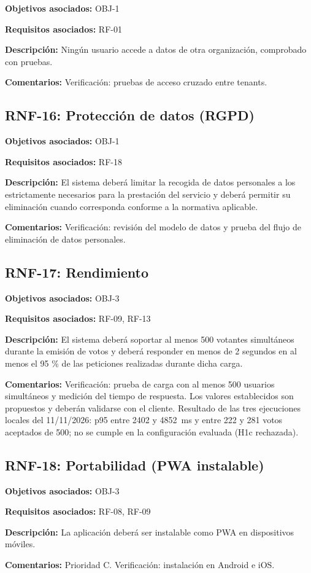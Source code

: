 \textbf{Objetivos asociados:} OBJ-1\par
\textbf{Requisitos asociados:} RF-01\par
\textbf{Descripción:} Ningún usuario accede a datos de otra organización, comprobado con pruebas.\par
\textbf{Comentarios:} Verificación: pruebas de acceso cruzado entre tenants.\par

\subsection{RNF-16: Protección de datos (RGPD)}

\textbf{Objetivos asociados:} OBJ-1\par
\textbf{Requisitos asociados:} RF-18\par
\textbf{Descripción:} El sistema deberá limitar la recogida de datos personales a los estrictamente necesarios para la prestación del servicio y deberá permitir su eliminación cuando corresponda conforme a la normativa aplicable.\par
\textbf{Comentarios:} Verificación: revisión del modelo de datos y prueba del flujo de eliminación de datos personales.\par

\subsection{RNF-17: Rendimiento}

\textbf{Objetivos asociados:} OBJ-3\par
\textbf{Requisitos asociados:} RF-09, RF-13\par
\textbf{Descripción:} El sistema deberá soportar al menos 500 votantes simultáneos durante la emisión de votos y deberá responder en menos de 2 segundos en al menos el 95 \% de las peticiones realizadas durante dicha carga.\par
\textbf{Comentarios:} Verificación: prueba de carga con al menos 500 usuarios simultáneos y medición del tiempo de respuesta. Los valores establecidos son propuestos y deberán validarse con el cliente. Resultado de las tres ejecuciones locales del 11/11/2026: p95 entre 2402 y 4852~ms y entre 222 y 281 votos aceptados de 500; no se cumple en la configuración evaluada (H1c rechazada).\par

\subsection{RNF-18: Portabilidad (PWA instalable)}

\textbf{Objetivos asociados:} OBJ-3\par
\textbf{Requisitos asociados:} RF-08, RF-09\par
\textbf{Descripción:} La aplicación deberá ser instalable como PWA en dispositivos móviles.\par
\textbf{Comentarios:} Prioridad C. Verificación: instalación en Android e iOS.\par

